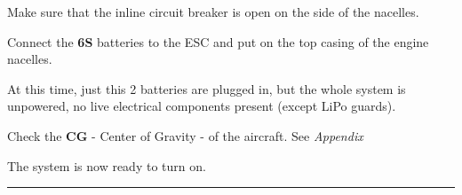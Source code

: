       \begin{todolist}
        \itemsep1pt\parskip0pt
        \item
          Make sure that the inline circuit breaker is open on the side of the
          nacelles.
        \item
          Connect the \textbf{6S} batteries to the ESC and put on
          the top casing of the engine nacelles.

          At this time, just this 2
          batteries are plugged in, but the whole system is unpowered, no live
          electrical components present (except LiPo guards).


        \item
          Check the \textbf{CG} - Center of Gravity - of the aircraft. See
          \emph{Appendix}
      \end{todolist}

      The system is now ready to turn on.

\begin{center}\rule{3in}{0.4pt}\end{center}
